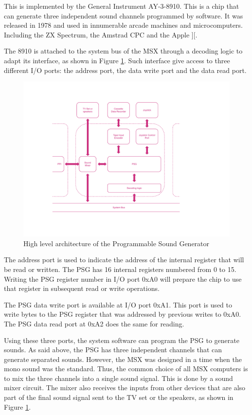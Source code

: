 This is implemented by the General Instrument AY-3-8910. This is a chip that can generate three independent sound channels programmed by software. It was released in 1978 and used in innumerable arcade machines and microcomputers. Including the ZX Spectrum, the Amstrad CPC and the Apple ][. 

The 8910 is attached to the system bus of the MSX through a decoding logic to adapt its interface, as shown in Figure \ref{fig:msx-arch-psg}. Such interface give access to three different I/O ports: the address port, the data write port and the data read port. 

\begin{figure}
	\centering
	\includegraphics[width=1\linewidth,trim={0cm 80 0 50}]{images/figures/msx-arch-psg}
	\caption{High level architecture of the Programmable Sound Generator}
	\label{fig:msx-arch-psg}
\end{figure}

The address port is used to indicate the address of the internal register that will be read or written. The PSG has 16 internal registers numbered from 0 to 15. Writing the PSG register number in I/O port 0xA0 will prepare the chip to use that register in subsequent read or write operations.

The PSG data write port is available at I/O port 0xA1. This port is used to write bytes to the PSG register that was addressed by previous writes to 0xA0. The PSG data read port at 0xA2 does the same for reading. 

Using these three ports, the system software can program the PSG to generate sounds. As said above, the PSG has three independent channels that can generate separated sounds. However, the MSX was designed in a time when the mono sound was the standard. Thus, the common choice of all MSX computers is to mix the three channels into a single sound signal. This is done by a sound mixer circuit. The mixer also receives the inputs from other devices that are also part of the final sound signal sent to the TV set or the speakers, as shown in Figure \ref{fig:msx-arch-psg}. 

